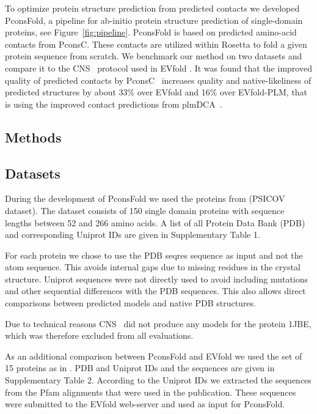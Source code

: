 \documentclass{bioinfo}
\begin{document}
To optimize protein structure prediction from predicted contacts we
developed PconsFold, a pipeline for ab-initio protein structure
prediction of  single-domain proteins, see Figure~\ref{fig:pipeline}. PconsFold is based on predicted
amino-acid contacts from PconsC. These contacts are utilized within
Rosetta to fold a given protein sequence from scratch. We benchmark
our method on two datasets and compare it to the CNS~\cite[]{Brunger18007608} protocol used in EVfold
\cite[]{marks_protein_2011}. It was found that the improved quality of predicted contacts
by PconsC~\cite[]{skwark_PconsC:_2013} increases quality and
native-likeliness of predicted structures by about 33\% over 
EVfold and 16\% over EVfold-PLM, that is using the improved contact
predictions from plmDCA~\cite[]{ekeberg_improved_2013}.

\begin{methods}
\section{Methods}

\subsection{Datasets}
During the development of PconsFold we used the proteins from
\citeauthor{jones_psicov:_2012} \citeyear{jones_psicov:_2012} (PSICOV
dataset). The dataset consists of 150 single domain proteins with sequence
lengths between 52 and 266 amino acids. A list of all Protein Data
Bank (PDB) \cite[]{berman_protein_2000} and corresponding Uniprot
\cite[]{magrane_uniprot_2011} IDs are given in Supplementary Table
1. 


For each protein we chose to use the PDB seqres sequence as input and
not the atom sequence. This avoids internal gaps due to missing
residues in the crystal structure.  Uniprot
sequences were not directly used to avoid including mutations and other sequential differences
with the PDB sequences. This also allows direct comparisons between predicted
models and native PDB structures. 

Due to technical reasons CNS~\cite[]{Brunger18007608} did not produce any models for the
protein 1JBE, which was therefore excluded from all evaluations.


As an additional comparison between PconsFold and EVfold we used the set
of 15 proteins as in \cite{marks_protein_2011}. PDB and Uniprot IDs and the sequences are given in
Supplementary Table 2. According to the Uniprot IDs we extracted the sequences from the
Pfam alignments that were used in the publication. These sequences were
submitted to the EVfold web-server and used as input for PconsFold.


\end{methods}
\end{document}
